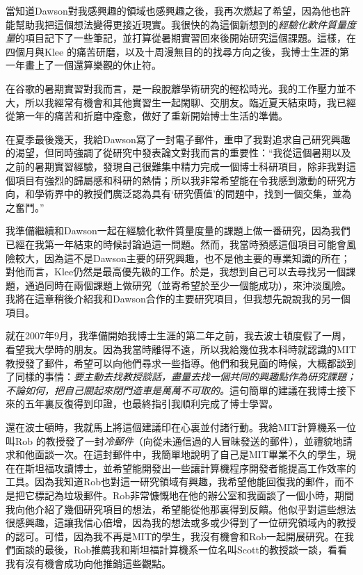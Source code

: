 \documentclass[12pt,UTF8,nofonts]{book}
\begin{document}
當知道Dawson對我感興趣的領域也感興趣之後，我再次燃起了希望，因為他也許能幫助我把這個想法變得更接近現實。我很快的為這個新想到的\emph{經驗化軟件質量度量}的項目記下了一些筆記，並打算從暑期實習回來後開始研究這個課題。這樣，在四個月與Klee 的痛苦研磨，以及十周漫無目的的找尋方向之後，我博士生涯的第一年畫上了一個還算樂觀的休止符。


在谷歌的暑期實習對我而言，是一段脫離學術研究的輕松時光。我的工作壓力並不大，所以我經常有機會和其他實習生一起閑聊、交朋友。臨近夏天結束時，我已經從第一年的痛苦和折磨中痊愈，做好了重新開始博士生活的準備。

在夏季最後幾天，我給Dawson寫了一封電子郵件，重申了我對追求自己研究興趣的渴望，但同時強調了從研究中發表論文對我而言的重要性：“我從這個暑期以及之前的暑期實習經驗，發現自己很難集中精力完成一個博士科研項目，除非我對這個項目有強烈的歸屬感和科研的熱情；所以我非常希望能在令我感到激動的研究方向，和學術界中的教授們廣泛認為具有‘研究價值’的問題中，找到一個交集，並為之奮鬥。”

我準備繼續和Dawson一起在經驗化軟件質量度量的課題上做一番研究，因為我們已經在我第一年結束的時候討論過這一問題。然而，我當時預感這個項目可能會風險較大，因為這不是Dawson主要的研究興趣，也不是他主要的專業知識的所在；對他而言，Klee仍然是最高優先級的工作。於是，我想到自己可以去尋找另一個課題，通過同時在兩個課題上做研究（並寄希望於至少一個能成功），來沖淡風險。我將在這章稍後介紹我和Dawson合作的主要研究項目，但我想先說說我的另一個項目。

\breakline

就在2007年9月，我準備開始我博士生涯的第二年之前，我去波士頓度假了一周，看望我大學時的朋友。因為我當時離得不遠，所以我給幾位我本科時就認識的MIT教授發了郵件，希望可以向他們尋求一些指導。他們和我見面的時候，大概都談到了同樣的事情：\emph{要主動去找教授談話，盡量去找一個共同的興趣點作為研究課題；不論如何，把自己關起來閉門造車是萬萬不可取的。}這句簡單的建議在我博士接下來的五年裏反復得到印證，也最終指引我順利完成了博士學習。

還在波士頓時，我就馬上將這個建議印在心裏並付諸行動。我給MIT計算機系一位叫Rob 的教授發了一封\emph{冷郵件}（向從未通信過的人冒昧發送的郵件），並禮貌地請求和他面談一次。在這封郵件中，我簡單地說明了自己是MIT畢業不久的學生，現在在斯坦福攻讀博士，並希望能開發出一些讓計算機程序開發者能提高工作效率的工具。因為我知道Rob也對這一研究領域有興趣，我希望他能回復我的郵件，而不是把它標記為垃圾郵件。Rob非常慷慨地在他的辦公室和我面談了一個小時，期間我向他介紹了幾個研究項目的想法，希望能從他那裏得到反饋。他似乎對這些想法很感興趣，這讓我信心倍增，因為我的想法或多或少得到了一位研究領域內的教授的認可。可惜，因為我不再是MIT的學生，我沒有機會和Rob一起開展研究。在我們面談的最後，Rob推薦我和斯坦福計算機系一位名叫Scott的教授談一談，看看我有沒有機會成功向他推銷這些觀點。
\end{document}
